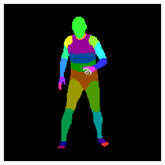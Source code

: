\documentclass{beamer}
\begin{document}
\begin{frame}
\begin{figure}
\begin{subfigure}{.3\textwidth}
\end{subfigure}
\begin{subfigure}{.3\textwidth}
  \centering
  \includegraphics[scale=0.2]{104_52_c0002_segm_64.png}
\end{subfigure}
\end{figure}


\end{frame}
\end{document}
